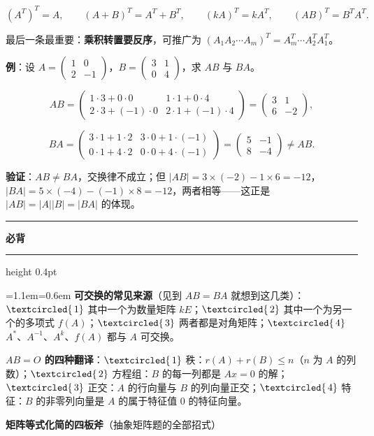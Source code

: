 \documentclass[11pt,openany,UTF8]{ctexbook}
\newcommand{\circled}[1]{\textcircled{\scriptsize\,#1}}
\newcommand{\callouthead}[2]{%
  \par\addvspace{7pt}\noindent
  {\color{#1}\rule[-0.15em]{3pt}{1.05em}}\hspace{0.5em}%
  {\bfseries\color{#1}#2}\par\nobreak\vspace{-0.35em}%
  {\color{rulesep}\hrule height 0.4pt}\nobreak\vspace{0.45em}%
  \begingroup\small\setlength{\parindent}{0pt}%
  \leftskip=1.1em\rightskip=0.6em\noindent\ignorespaces}
\newcommand{\calloutend}{\par\endgroup\addvspace{7pt}}
\newenvironment{callkey}[1]{\callouthead{keybar}{#1}}{\calloutend}
\begin{document}
\[(A^T)^T=A,\qquad (A+B)^T=A^T+B^T,\qquad (kA)^T=kA^T,\qquad (AB)^T=B^TA^T .\]

最后一条最重要：\textbf{乘积转置要反序}，可推广为 $(A_1A_2\cdots A_m)^T=A_m^T\cdots A_2^TA_1^T$。

\textbf{例}：设 $A=\begin{pmatrix}1&0\\2&-1\end{pmatrix}$，$B=\begin{pmatrix}3&1\\0&4\end{pmatrix}$，求 $AB$ 与 $BA$。

\[AB=\begin{pmatrix}1\cdot3+0\cdot0&1\cdot1+0\cdot4\\2\cdot3+(-1)\cdot0&2\cdot1+(-1)\cdot4\end{pmatrix}=\begin{pmatrix}3&1\\6&-2\end{pmatrix},\]

\[BA=\begin{pmatrix}3\cdot1+1\cdot2&3\cdot0+1\cdot(-1)\\0\cdot1+4\cdot2&0\cdot0+4\cdot(-1)\end{pmatrix}=\begin{pmatrix}5&-1\\8&-4\end{pmatrix}\ne AB .\]

\textbf{验证}：$AB\ne BA$，交换律不成立；但 $\vert AB\vert=3\times(-2)-1\times6=-12$，$\vert BA\vert=5\times(-4)-(-1)\times8=-12$，两者相等——这正是 $\vert AB\vert=\vert A\vert\vert B\vert=\vert BA\vert$ 的体现。

\begin{callkey}{必背}
\textbf{可交换的常见来源}（见到 $AB=BA$ 就想到这几类）：$\circled{1}$ 其中一个为数量矩阵 $kE$；$\circled{2}$ 其中一个为另一个的多项式 $f(A)$；$\circled{3}$ 两者都是对角矩阵；$\circled{4}$ $A^*$、$A^{-1}$、$A^k$、$f(A)$ 都与 $A$ 可交换。

\textbf{$AB=O$ 的四种翻译}：$\circled{1}$ 秩：$r(A)+r(B)\le n$（$n$ 为 $A$ 的列数）；$\circled{2}$ 方程组：$B$ 的每一列都是 $Ax=0$ 的解；$\circled{3}$ 正交：$A$ 的行向量与 $B$ 的列向量正交；$\circled{4}$ 特征：$B$ 的非零列向量是 $A$ 的属于特征值 $0$ 的特征向量。

\end{callkey}

\textbf{矩阵等式化简的四板斧}（抽象矩阵题的全部招式）
\end{document}
